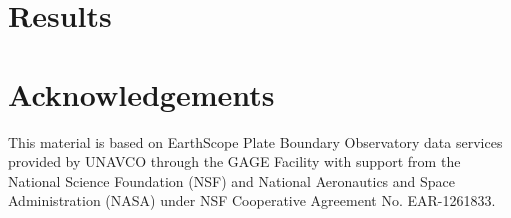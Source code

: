 \documentclass[12pt]{article}
\begin{document}
\section*{Results}
\section*{Acknowledgements}

This material is based on EarthScope Plate Boundary Observatory data services provided by UNAVCO through the GAGE Facility with support from the National Science Foundation (NSF) and National Aeronautics and Space Administration (NASA) under NSF Cooperative Agreement No. EAR-1261833.



\end{document}
